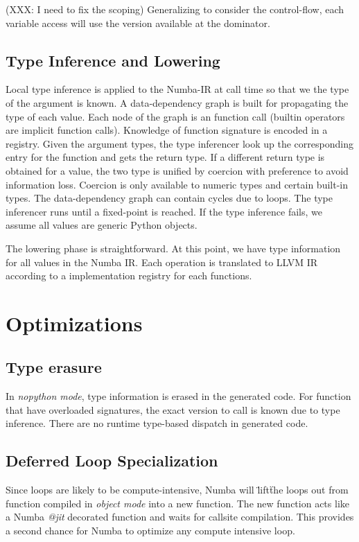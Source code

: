 \documentclass{acm_proc_article-sp}
\begin{document}
(XXX: I need to fix the scoping)
Generalizing to consider the control-flow, each variable access will use
the version available at the dominator.

\subsection{Type Inference and Lowering}

Local type inference is applied to the Numba-IR at call time so that we
the type of the argument is known. A data-dependency graph is built for
propagating the type of each value.  Each node of the graph is an function call
(builtin operators are implicit function calls). Knowledge of function signature
is encoded in a registry. Given the argument types, the type inferencer look up
the corresponding entry for the function and gets the return type. If a
different return type is obtained for a value, the two type is unified by
coercion with preference to avoid information loss. Coercion is only available
to numeric types and certain built-in types. The data-dependency graph can
contain cycles due to loops. The type inferencer runs until a fixed-point is
reached. If the type inference fails, we assume all values are generic Python
objects.

The lowering phase is straightforward.  At this point, we have type information
for all values in the Numba IR. Each operation is translated to LLVM IR
according to a implementation registry for each functions.

\section{Optimizations}

\subsection{Type erasure}

In \textit{nopython mode}, type information is erased in the generated code.
For function that have overloaded signatures, the exact version to call is known
due to type inference. There are no runtime type-based dispatch in generated
code.

\subsection{Deferred Loop Specialization}

Since loops are likely to be compute-intensive, Numba will \"lift\" the loops
out from function compiled in \textit{object mode} into a new function.
The new function acts like a Numba \textit{@jit} decorated function and
waits for callsite compilation. This provides a second chance for Numba to
optimize any compute intensive loop.
\end{document}

